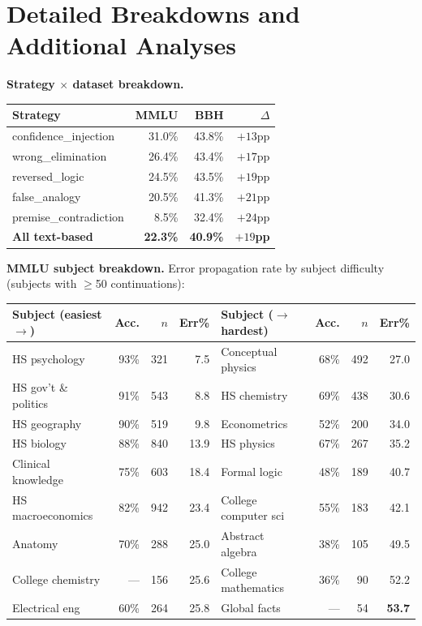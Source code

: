 \documentclass[10pt]{article} %
\begin{document}
\section{Detailed Breakdowns and Additional Analyses}
\label{app:mmlu_subjects}
\label{app:bbh_subtasks}
\label{app:label_quality_fig}
\label{app:uptake}

\textbf{Strategy $\times$ dataset breakdown.}
\label{app:strategy_table}

\begin{center}
\scriptsize
\begin{tabular}{lrrr}
\toprule
\textbf{Strategy} & \textbf{MMLU} & \textbf{BBH} & \textbf{$\Delta$} \\
\midrule
confidence\_injection & 31.0\% & 43.8\% & $+13$pp \\
wrong\_elimination & 26.4\% & 43.4\% & $+17$pp \\
reversed\_logic & 24.5\% & 43.5\% & $+19$pp \\
false\_analogy & 20.5\% & 41.3\% & $+21$pp \\
premise\_contradiction & 8.5\% & 32.4\% & $+24$pp \\
\midrule
\textbf{All text-based} & \textbf{22.3\%} & \textbf{40.9\%} & \textbf{$+19$pp} \\
\bottomrule
\end{tabular}
\end{center}


\textbf{MMLU subject breakdown.} Error propagation rate by subject difficulty (subjects with $\geq$50 continuations):

\begin{center}
\scriptsize
\begin{tabular}{lrrr|lrrr}
\toprule
\textbf{Subject (easiest $\to$)} & \textbf{Acc.} & \textbf{$n$} & \textbf{Err\%} & \textbf{Subject ($\to$ hardest)} & \textbf{Acc.} & \textbf{$n$} & \textbf{Err\%} \\
\midrule
HS psychology & 93\% & 321 & 7.5 & Conceptual physics & 68\% & 492 & 27.0 \\
HS gov't \& politics & 91\% & 543 & 8.8 & HS chemistry & 69\% & 438 & 30.6 \\
HS geography & 90\% & 519 & 9.8 & Econometrics & 52\% & 200 & 34.0 \\
HS biology & 88\% & 840 & 13.9 & HS physics & 67\% & 267 & 35.2 \\
Clinical knowledge & 75\% & 603 & 18.4 & Formal logic & 48\% & 189 & 40.7 \\
HS macroeconomics & 82\% & 942 & 23.4 & College computer sci & 55\% & 183 & 42.1 \\
Anatomy & 70\% & 288 & 25.0 & Abstract algebra & 38\% & 105 & 49.5 \\
College chemistry & --- & 156 & 25.6 & College mathematics & 36\% & 90 & 52.2 \\
Electrical eng & 60\% & 264 & 25.8 & Global facts & --- & 54 & \textbf{53.7} \\
\bottomrule
\end{tabular}
\end{center}
\end{document}
